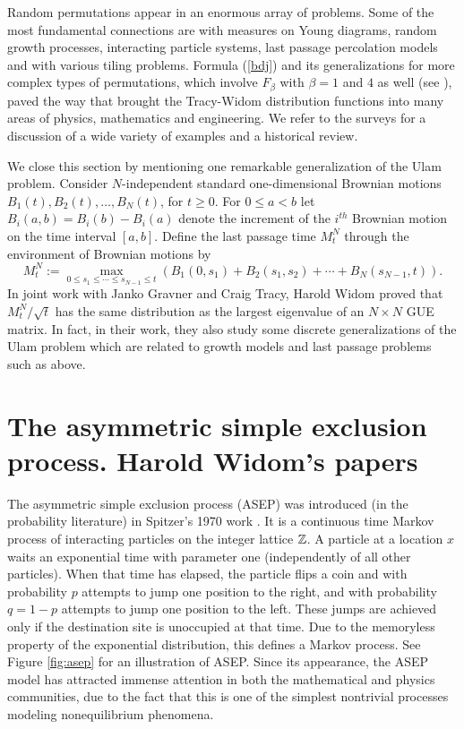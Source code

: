 \documentclass[11pt,letterpaper,reqno]{amsart}
\theoremstyle{definition}
\theoremstyle{remark}
\numberwithin{equation}{section}
\begin{document}
Random permutations appear in an enormous array of problems.
Some of the most  fundamental connections are with measures on Young diagrams, random growth processes, interacting particle systems, last passage percolation models and with various tiling problems.
Formula (\ref{bdj}) and its generalizations for more complex types
of permutations,  which involve $F_{\beta}$ with $\beta = 1$ and $4$ as well (see \cite{BR}),  paved the way
that brought the Tracy-Widom distribution functions into many areas of physics, mathematics
and engineering.
We refer to the surveys \cite{deift2,CorwinBAMS} for a discussion of a wide variety of examples and a historical review.


We close this section by mentioning one remarkable generalization of the Ulam problem. Consider $N$-independent standard one-dimensional Brownian motions $B_1(t),B_2(t),\ldots, B_N(t)$, for $t\geq 0$. For $0\leq a<b$ let $B_i(a,b) = B_i(b)-B_i(a)$ denote the increment of the $i^{th}$ Brownian motion on the time interval $[a,b]$. Define the last passage time $M^N_t$ through the environment of Brownian motions by
$$
M^N_t := \max_{0\leq s_1\leq \cdots\leq s_{N-1}\leq t} \left(B_1(0,s_1)+B_2(s_1,s_2)+\cdots + B_{N}(s_{N-1},t)\right).
$$
In joint work \cite{105} with Janko Gravner and Craig Tracy, Harold Widom proved that $M^N_t/\sqrt{t}$  has the same distribution as the largest eigenvalue of an $N\times N$ GUE matrix. In fact, in their work, they also study some discrete generalizations of the Ulam problem which are related to growth models and last passage problems such as above.

\section{The asymmetric simple exclusion process. Harold Widom's papers  \cite{133,134,135}}
The asymmetric simple exclusion process (ASEP) was introduced (in the probability literature) in Spitzer's 1970 work \cite{Sp}. It is a continuous time Markov process of interacting particles on the integer lattice ${\Bbb Z}$. A particle at a location $x$ waits an exponential time
with parameter one (independently of all other particles). When that time has elapsed, the particle flips a coin and with probability $p$ attempts to jump one position to the right, and with probability $q=1-p$ attempts to jump one position to the left. These jumps are achieved only if the destination site is unoccupied at that time. Due to the memoryless property of the exponential distribution, this defines a Markov process. See Figure \ref{fig:asep} for an illustration of ASEP. Since its appearance, the ASEP model has  attracted immense attention in both the mathematical and physics communities, due to the fact that this is one of the simplest nontrivial processes modeling nonequilibrium phenomena.
\end{document}
